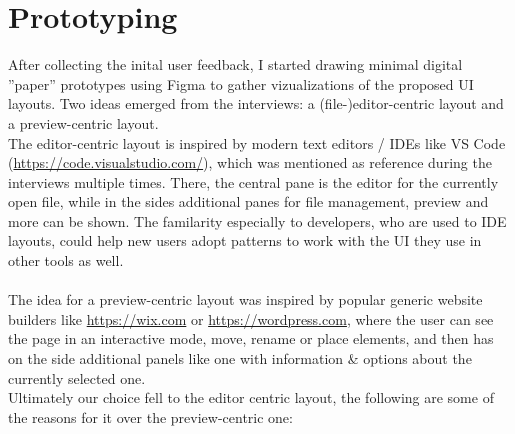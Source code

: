 
%
\chapter{Prototyping}
\label{chap:prototyping} 

After collecting the inital user feedback, I started drawing minimal digital ''paper'' prototypes using Figma to gather vizualizations of the proposed UI layouts.
Two ideas emerged from the interviews: a (file-)editor-centric layout and a preview-centric layout.
\\
The editor-centric layout is inspired by modern text editors / IDEs like VS Code (\url{https://code.visualstudio.com/}), which was mentioned as reference during the interviews multiple times.
There, the central pane is the editor for the currently open file, while in the sides additional panes for file management, preview and more can be shown.
The familarity especially to developers, who are used to IDE layouts, could help new users adopt patterns to work with the UI they use in other tools as well.
\\\\
The idea for a preview-centric layout was inspired by popular generic website builders like \url{https://wix.com} or \url{https://wordpress.com}, where the user
can see the page in an interactive mode, move, rename or place elements, and then has on the side additional panels like one with information \& options about the
currently selected one.
\\
Ultimately our choice fell to the editor centric layout, the following are some of the reasons for it over the preview-centric one:
